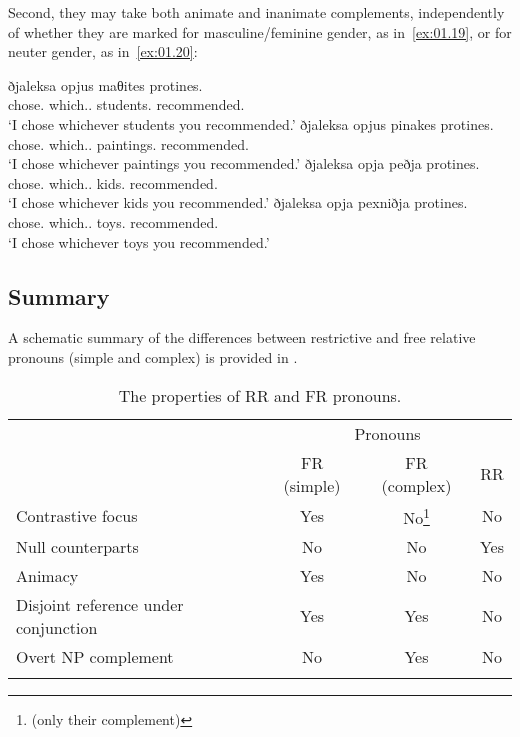 \documentclass[output=paper]{langsci/langscibook}
\begin{document}
Second, they may take both animate and inanimate complements, independently of
whether they are marked for masculine/feminine gender, as in~\eqref{ex:01.19}, or for
neuter gender, as in~\eqref{ex:01.20}:

\ea {}\label{ex:01.19}
	\ea
		\gll ðjaleksa opjus maθites protines.\\
			chose.\Fsg{} which.\M{}.\Pl{} students.\Acc{} recommended.\Ssg{}\\
		\glt ‘I chose whichever students you recommended.'
	\ex
		\gll ðjaleksa opjus pinakes protines.\\
			chose.\Fsg{} which.\M{}.\Pl{} paintings.\Acc{} recommended.\Ssg{}\\
		\glt ‘I chose whichever paintings you recommended.'
	\z
\ex {}\label{ex:01.20}
	\ea
		\gll ðjaleksa opja peðja protines.\\
			chose.\Fsg{} which.\glossN.\Pl{} kids.\Acc{} recommended.\Ssg{}\\
		\glt ‘I chose whichever kids you recommended.'
	\ex
		\gll ðjaleksa opja pexniðja protines.\\
			chose.\Fsg{} which.\glossN.\Pl{} toys.\Acc{} recommended.\Ssg{}\\
		\glt ‘I chose whichever toys you recommended.'
	\z
\z

\subsection{Summary}

A schematic summary of the differences between restrictive and free relative
pronouns (simple and complex) is provided in .

\begin{table}
\caption{The properties of \gls{RR} and \gls{FR} pronouns.\label{tab:3}}
\begin{tabular}{lccc}
\lsptoprule
                                     & \multicolumn{3}{c}{Pronouns}\\\cmidrule(lr){2-4}
                                     & \gls{FR} (simple)           & \gls{FR} (complex)& \gls{RR} \\\midrule
Contrastive focus                    & Yes                       & No\footnote{(only their complement)}  & No \\
Null counterparts                    & No                        & No                                    & Yes \\
Animacy                              & Yes                       & No                                    & No \\
Disjoint reference under conjunction & Yes                       & Yes                                   & No \\
Overt NP complement                  & No                        & Yes                                   & No \\
\lspbottomrule
\end{tabular}
\end{table}
\end{document}
